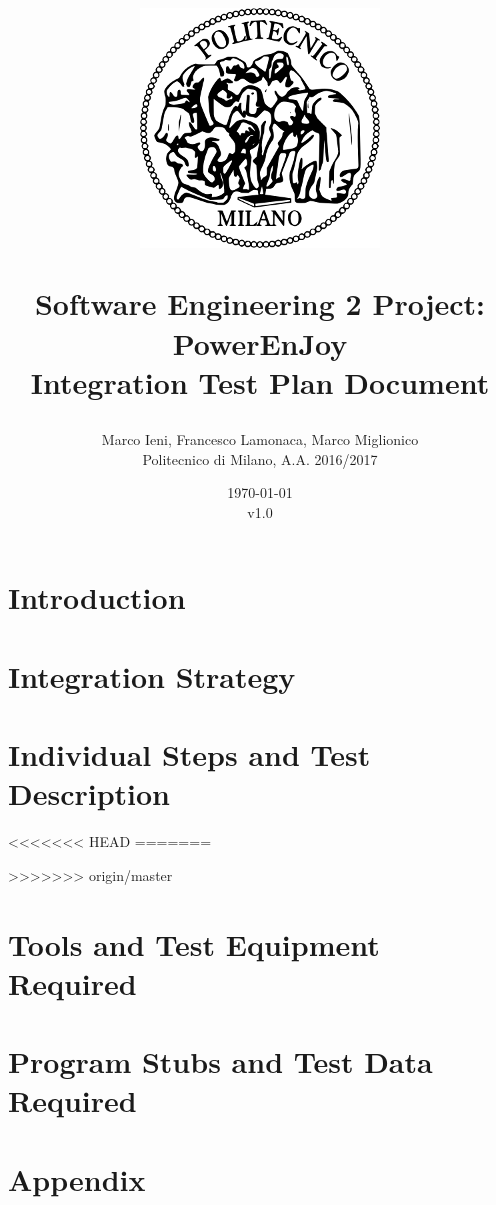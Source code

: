 \documentclass[a4paper, 12pt]{report}
\title{
	\begin{figure}[h]
		\centering
		\includegraphics{../common_resources/logo_polimi.png}
	\end{figure}
	\vspace{30px}
	Software Engineering 2 Project: PowerEnJoy \\ \vspace{1em}
	\textbf{I}ntegration \textbf{T}est \textbf{P}lan \textbf{D}ocument
}
\author{Marco Ieni, Francesco Lamonaca, Marco Miglionico\\Politecnico di Milano, A.A. 2016/2017}
\date{\today\\v1.0}
\begin{document}
\maketitle
\tableofcontents

\chapter{Introduction}
\label{ch:introduction}





\chapter{Integration Strategy}
\label{ch:integration_strategy}





\chapter{Individual Steps and Test Description}
\label{ch:individual_steps}


<<<<<<< HEAD
=======

>>>>>>> origin/master

\chapter{Tools and Test Equipment Required}
\label{ch:tools}

\chapter{Program Stubs and Test Data Required}
\label{ch:program_stubs}

\appendix
\chapter{Appendix}

\end{document}
